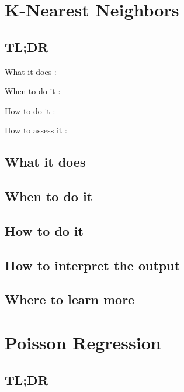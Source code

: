 \documentclass[
]{book}
\begin{document}
\hypertarget{k-nearest-neighbors}{%
\chapter{K-Nearest Neighbors}\label{k-nearest-neighbors}}

\hypertarget{tldr-7}{%
\section{TL;DR}\label{tldr-7}}

What it does
:

When to do it
:

How to do it
:

How to assess it
:

\hypertarget{what-it-does-7}{%
\section{What it does}\label{what-it-does-7}}

\hypertarget{when-to-do-it-7}{%
\section{When to do it}\label{when-to-do-it-7}}

\hypertarget{how-to-do-it-7}{%
\section{How to do it}\label{how-to-do-it-7}}

\hypertarget{how-to-interpret-the-output-7}{%
\section{How to interpret the output}\label{how-to-interpret-the-output-7}}

\hypertarget{where-to-learn-more-7}{%
\section{Where to learn more}\label{where-to-learn-more-7}}

\hypertarget{poisson-regression}{%
\chapter{Poisson Regression}\label{poisson-regression}}

\hypertarget{tldr-8}{%
\section{TL;DR}\label{tldr-8}}
\end{document}
